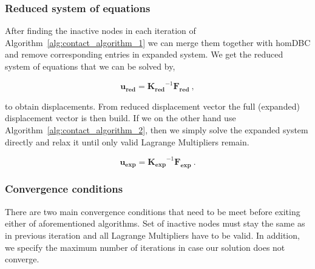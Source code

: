 \documentclass[10pt,a4paper]{article}
\begin{document}
\subsubsection{Reduced system of equations}

After finding the inactive nodes in each iteration of Algorithm~\ref{alg:contact_algorithm_1} we can merge them together with homDBC and remove corresponding entries in expanded system. We get the reduced system of equations that we can be solved by, 

\begin{equation}
	\mathbf{u_{red}} = \mathbf{K_{red}}^{-1}  \mathbf{F_{red}} \:,
	\label{eq:reduced_system}
\end{equation}

to obtain displacements. From reduced displacement vector the full (expanded) displacement vector is then build. If we on the other hand use Algorithm~\ref{alg:contact_algorithm_2}, then we simply solve the expanded system directly and relax it until only valid Lagrange Multipliers remain.

\begin{equation}
	\mathbf{u_{exp}} = \mathbf{K_{exp}}^{-1}  \mathbf{F_{exp}} \:.
	\label{eq:expanded_system}
\end{equation}



\subsubsection{Convergence conditions}

There are two main convergence conditions that need to be meet before exiting either of aforementioned algorithms. Set of inactive nodes must stay the same as in previous iteration and all Lagrange Multipliers have to be valid. In addition, we specify the maximum number of iterations in case our solution does not converge.

% 


\nocite{*}
\end{document}
